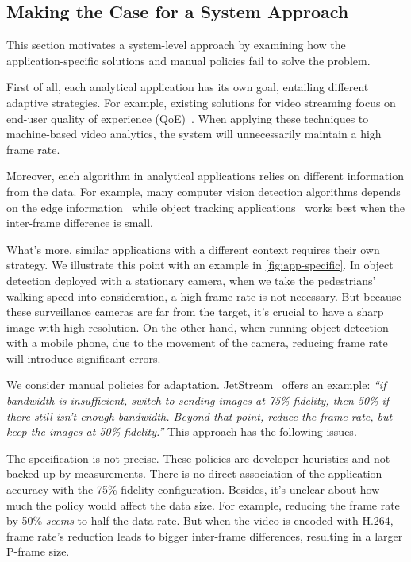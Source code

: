 \subsection{Making the Case for a System Approach}
\label{sec:making-case-sys-approach}

This section motivates a system-level approach by examining how the
application-specific solutions and manual policies fail to solve the problem.

 First of all, each
analytical application has its own goal, entailing different adaptive
strategies. For example, existing solutions for video streaming focus on
end-user quality of experience (QoE)~\cite{yin2015control, michalos2012dynamic,
  pantos2016http}. When applying these techniques to machine-based video
analytics, the system will unnecessarily maintain a high frame rate.

Moreover, each algorithm in analytical applications relies on different
information from the data. For example, many computer vision detection
algorithms depends on the edge information~\cite{canny1986computational,
  lowe2004distinctive, viola2001rapid} while object tracking
applications~\cite{allen2004object} works best when the inter-frame difference
is small.

What's more, similar applications with a different context requires their own
strategy. We illustrate this point with an example in
\autoref{fig:app-specific}. In object detection deployed with a stationary
camera, when we take the pedestrians' walking speed into consideration, a high
frame rate is not necessary. But because these surveillance cameras are far from
the target, it's crucial to have a sharp image with high-resolution. On the
other hand, when running object detection with a mobile phone, due to the
movement of the camera, reducing frame rate will introduce significant errors.

 We consider manual policies for
adaptation. JetStream~\cite{rabkin2014aggregation} offers an example:
\textit{``if bandwidth is insufficient, switch to sending images at 75\%
  fidelity, then 50\% if there still isn't enough bandwidth. Beyond that point,
  reduce the frame rate, but keep the images at 50\% fidelity.''} This approach
has the following issues.

The specification is not precise. These policies are developer heuristics and
not backed up by measurements. There is no direct association of the application
accuracy with the 75\% fidelity configuration. Besides, it's unclear about how
much the policy would affect the data size. For example, reducing the frame rate
by 50\% \textit{seems} to half the data rate. But when the video is encoded with
H.264, frame rate's reduction leads to bigger inter-frame differences, resulting
in a larger P-frame size.

